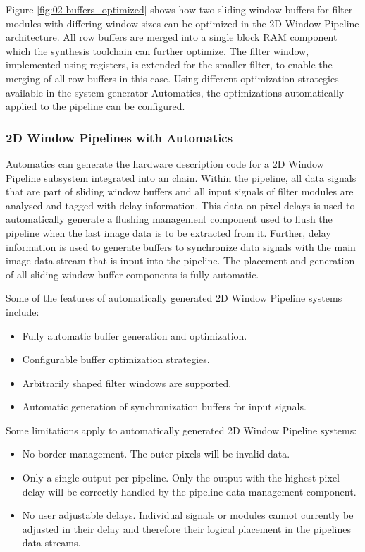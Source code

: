 Figure \ref{fig:02-buffers_optimized} shows how two sliding window buffers for filter modules with differing window sizes can be optimized in the 2D Window Pipeline architecture.
All row buffers are merged into a single block RAM component which the synthesis toolchain can further optimize.
The filter window, implemented using registers, is extended for the smaller filter, to enable the merging of all row buffers in this case.
Using different optimization strategies available in the system generator Automatics, the optimizations automatically applied to the pipeline can be configured.


\subsubsection{2D Window Pipelines with Automatics}

Automatics can generate the hardware description code for a 2D Window Pipeline subsystem integrated into an \asterics chain.
Within the pipeline, all data signals that are part of sliding window buffers and all input signals of filter modules are analysed and tagged with delay information.
This data on pixel delays is used to automatically generate a flushing management component used to flush the pipeline when the last image data is to be extracted from it.
Further, delay information is used to generate buffers to synchronize data signals with the main image data stream that is input into the pipeline.
The placement and generation of all sliding window buffer components is fully automatic.

Some of the features of automatically generated 2D Window Pipeline systems include:
\begin{itemize}
\item Fully automatic buffer generation and optimization.
\item Configurable buffer optimization strategies.
\item Arbitrarily shaped filter windows are supported.
\item Automatic generation of synchronization buffers for input signals.
\end{itemize}

Some limitations apply to automatically generated 2D Window Pipeline systems:
\begin{itemize}
\item No border management. The outer pixels will be invalid data.
\item Only a single output per pipeline. Only the output with the highest pixel delay will be correctly handled by the pipeline data management component.
\item No user adjustable delays. Individual signals or modules cannot currently be adjusted in their delay and therefore their logical placement in the pipelines data streams.
\end{itemize}


